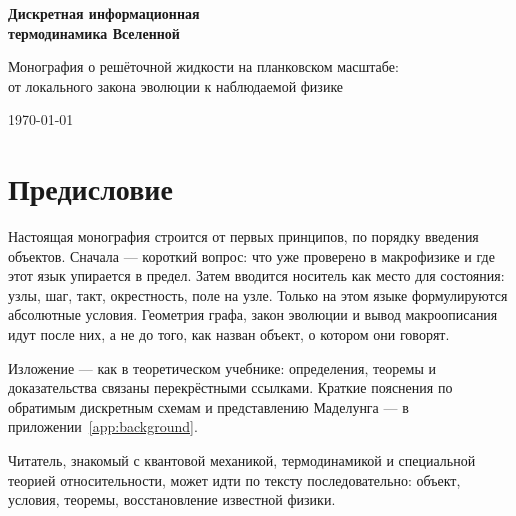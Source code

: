 \begin{titlepage}
  \centering
  \vspace*{2cm}
  {\LARGE\bfseries Дискретная информационная\\[0.4em] термодинамика Вселенной\par}
  \vspace{1.2cm}
  {\large Монография о решёточной жидкости на планковском масштабе:\\
  от локального закона эволюции к наблюдаемой физике\par}
  \vfill
  {\large \today\par}
\end{titlepage}

\chapter*{Предисловие}

Настоящая монография строится от первых принципов, по порядку введения объектов.
Сначала --- короткий вопрос: что уже проверено в макрофизике и где этот язык упирается в предел.
Затем вводится носитель как место для состояния: узлы, шаг, такт, окрестность, поле на узле.
Только на этом языке формулируются абсолютные условия.
Геометрия графа, закон эволюции и вывод макроописания идут после них,
а не до того, как назван объект, о котором они говорят.

Изложение --- как в теоретическом учебнике: определения, теоремы и доказательства
связаны перекрёстными ссылками.
Краткие пояснения по обратимым дискретным схемам и представлению Маделунга ---
в приложении~\ref{app:background}.

Читатель, знакомый с квантовой механикой, термодинамикой и специальной теорией относительности,
может идти по тексту последовательно: объект, условия, теоремы, восстановление известной физики.

\tableofcontents
